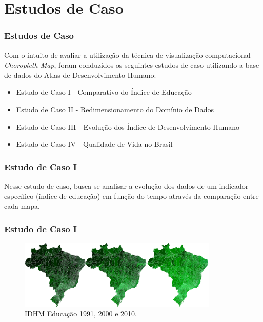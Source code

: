 \documentclass[aspectratio=169]{beamer}
\begin{document}
\section{Estudos de Caso}
\begin{frame}
\frametitle{Estudos de Caso}
\justifying

Com o intuito de avaliar a utilização da técnica de visualização computacional \textit{Choropleth Map}, foram conduzidos os seguintes estudos de caso utilizando a base de dados do Atlas de Desenvolvimento Humano:

\begin{itemize}
\item Estudo de Caso I - Comparativo do Índice de Educação
\item Estudo de Caso II - Redimensionamento do Domínio de Dados
\item Estudo de Caso III - Evolução dos Índice de Desenvolvimento Humano
\item Estudo de Caso IV - Qualidade de Vida no Brasil
\end{itemize}


\end{frame}

\begin{frame}
\frametitle{Estudo de Caso I}
\justifying

Nesse estudo de caso, busca-se analisar a evolução dos dados de um indicador específico (índice de educação) em função do tempo através da comparação entre cada mapa.


\end{frame}



\begin{frame}
\frametitle{Estudo de Caso I}
\justifying

\begin{figure}
\centering
\includegraphics[width=0.85\textwidth]{images/comparativo.png}
\caption{IDHM Educação 1991, 2000 e 2010.}
\end{figure}

\end{frame}
\end{document}
